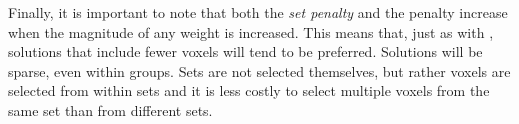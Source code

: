 Finally, it is important to note that both the {\em set penalty} and the {\lasso} penalty increase when the magnitude of any weight is increased.  This means that, just as with {\lasso}, solutions that include fewer voxels will tend to be preferred. Solutions will be sparse, even within groups. Sets are not selected themselves, but rather voxels are selected from within sets and it is less costly to select multiple voxels from the same set than from different sets.

